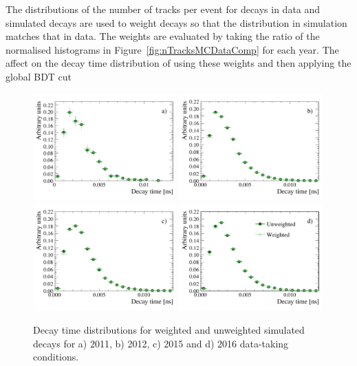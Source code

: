 The distributions of the number of tracks per event for \bdkpi decays in data and simulated decays are used to weight \bdkpi decays so that the distribution in simulation matches that in data. The weights are evaluated by taking the ratio of the normalised histograms in Figure~\ref{fig:nTracksMCDataComp} for each year. The affect on the decay time distribution of using these weights and then applying the global BDT cut

\clearpage 
\begin{figure}[h]%
  \centering
    \includegraphics[width=0.49\textwidth]{./Figs/LifetimeMeasurement/2011_decaytime_Bd2KPi_weighting_impact.pdf}
    \includegraphics[width=0.49\textwidth]{./Figs/LifetimeMeasurement/2012_decaytime_Bd2KPi_weighting_impact.pdf}
    \includegraphics[width=0.49\textwidth]{./Figs/LifetimeMeasurement/2015_decaytime_Bd2KPi_weighting_impact.pdf}
    \includegraphics[width=0.49\textwidth]{./Figs/LifetimeMeasurement/2016_decaytime_Bd2KPi_weighting_impact.pdf}
  \caption{Decay time distributions for weighted and unweighted \bdkpi simulated decays for a) 2011, b) 2012, c) 2015 and d) 2016 data-taking conditions.}%
  \label{fig:BdToKpi_weightDecayTime}
\end{figure}

